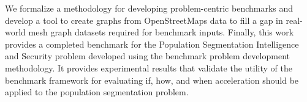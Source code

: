 We formalize a methodology for developing problem-centric \gai benchmarks and develop a tool to create graphs from OpenStreetMaps data to fill a gap in real-world mesh graph datasets required for benchmark inputs. 
Finally, this work provides a completed benchmark for the Population Segmentation Intelligence and Security problem developed using the \gai benchmark problem development methodology.
It provides experimental results that validate the utility of the \gai benchmark framework for evaluating if, how, and when \gai acceleration should be applied to the population segmentation problem.





